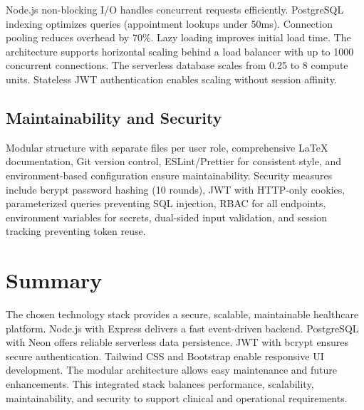 \justifying
\noindent Node.js non-blocking I/O handles concurrent requests efficiently. PostgreSQL indexing optimizes queries (appointment lookups under 50ms). Connection pooling reduces overhead by 70\%. Lazy loading improves initial load time. The architecture supports horizontal scaling behind a load balancer with up to 1000 concurrent connections. The serverless database scales from 0.25 to 8 compute units. Stateless JWT authentication enables scaling without session affinity.

\subsection{Maintainability and Security}

\justifying
\noindent Modular structure with separate files per user role, comprehensive LaTeX documentation, Git version control, ESLint/Prettier for consistent style, and environment-based configuration ensure maintainability. Security measures include bcrypt password hashing (10 rounds), JWT with HTTP-only cookies, parameterized queries preventing SQL injection, RBAC for all endpoints, environment variables for secrets, dual-sided input validation, and session tracking preventing token reuse.

\section{Summary}

\justifying
\noindent The chosen technology stack provides a secure, scalable, maintainable healthcare platform. Node.js with Express delivers a fast event-driven backend. PostgreSQL with Neon offers reliable serverless data persistence. JWT with bcrypt ensures secure authentication. Tailwind CSS and Bootstrap enable responsive UI development. The modular architecture allows easy maintenance and future enhancements. This integrated stack balances performance, scalability, maintainability, and security to support clinical and operational requirements.